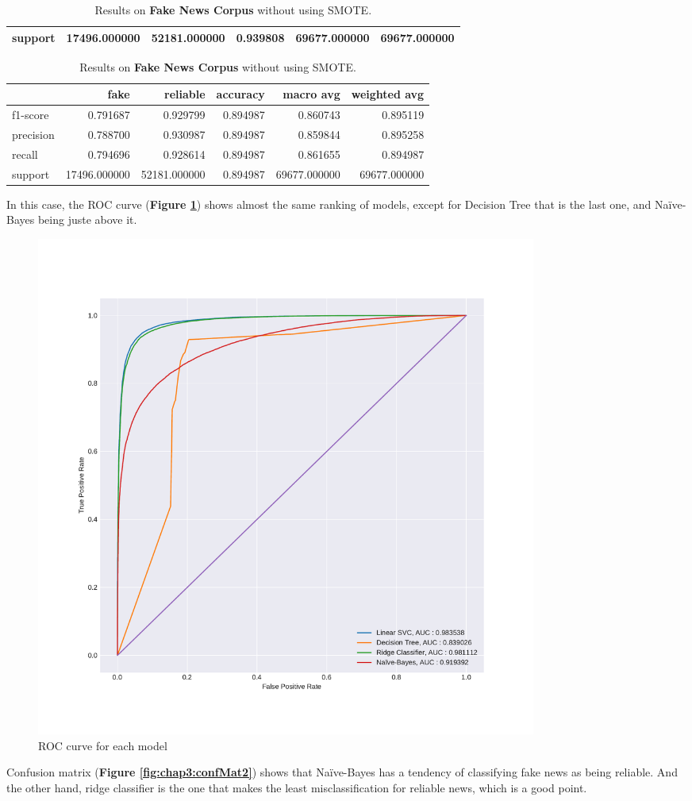 \begin{table}
\begin{subtable}{\textwidth}
\begin{tabular}{lrrrrr}
 support   &  17496.000000 &  52181.000000 &  0.939808 &  69677.000000 &  69677.000000 \\
 \bottomrule
 \end{tabular}
 \caption{Raw results for Ridge Classifier on \textbf{Fake News Corpus}}
\end{subtable}
\begin{subtable}{\textwidth}
 \begin{tabular}{lrrrrr}
 \toprule
 {} &          fake &      reliable &  accuracy &     macro avg &  weighted avg \\
 \midrule
 f1-score  &      0.791687 &      0.929799 &  0.894987 &      0.860743 &      0.895119 \\
 precision &      0.788700 &      0.930987 &  0.894987 &      0.859844 &      0.895258 \\
 recall    &      0.794696 &      0.928614 &  0.894987 &      0.861655 &      0.894987 \\
 support   &  17496.000000 &  52181.000000 &  0.894987 &  69677.000000 &  69677.000000 \\
 \bottomrule
 \end{tabular}
 \caption{Raw results for Decision Tree on \textbf{Fake News Corpus}}
\end{subtable}
\caption{Results on \textbf{Fake News Corpus} without using SMOTE.}
\end{table}
In this case, the ROC curve (\textbf{Figure \ref{fig:chap3:roc2}}) shows almost the same ranking of models, except for Decision Tree that is the last one, and Na\"{i}ve-Bayes being juste above it. 
\begin{figure}
 \centering
 \includegraphics[width=0.8\textwidth]{images/chapitre3/roc2}
 \caption{ROC curve for each model}
 \label{fig:chap3:roc2}
\end{figure}
Confusion matrix (\textbf{Figure \ref{fig:chap3:confMat2}}) shows that Na\"{i}ve-Bayes has a tendency of classifying fake news as being reliable. And the other hand, ridge classifier is the one that makes the least misclassification for reliable news, which is a good point. \\

